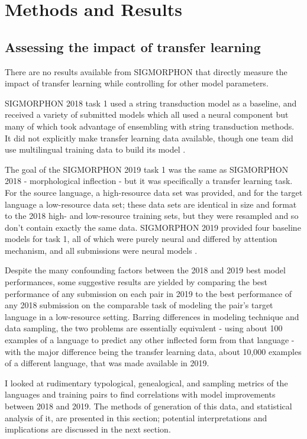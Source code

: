 \chapter{Methods and Results}

\section{Assessing the impact of transfer learning}

There are no results available from SIGMORPHON that directly measure the impact of transfer learning while controlling for other model parameters. 

SIGMORPHON 2018 task 1 used a string transduction model as a baseline, and received a variety of submitted models which all used a neural component but many of which took advantage of ensembling with string transduction methods. It did not explicitly make transfer learning data available, though one team did use multilingual training data to build its model \parencite{Cotterell2018b}.

The goal of the SIGMORPHON 2019 task 1 was the same as SIGMORPHON 2018 - morphological inflection - but it was specifically a transfer learning task. For the source language, a high-resource data set was provided, and for the target language a low-resource data set; these data sets are identical in size and format to the 2018 high- and low-resource training sets, but they were resampled and so don't contain exactly the same data. SIGMORPHON 2019 provided four baseline models for task 1, all of which were purely neural and differed by attention mechanism, and all submissions were neural models \parencite{McCarthy2019}. 

Despite the many confounding factors between the 2018 and 2019 best model performances, some suggestive results are yielded by comparing the best performance of any submission on each pair in 2019 to the best performance of any 2018 submission on the comparable task of modeling the pair's target language in a low-resource setting. Barring differences in modeling technique and data sampling, the two problems are essentially equivalent - using about 100 examples of a language to predict any other inflected form from that language - with the major difference being the transfer learning data, about 10,000 examples of a different language, that was made available in 2019. 

I looked at rudimentary typological, genealogical, and sampling metrics of the languages and training pairs to find correlations with model improvements between 2018 and 2019. The methods of generation of this data, and statistical analysis of it, are presented in this section; potential interpretations and implications are discussed in the next section.

